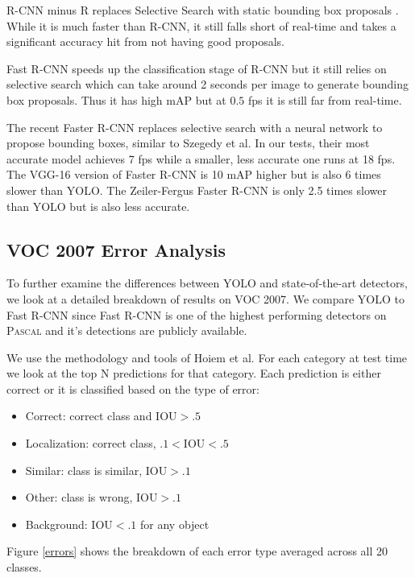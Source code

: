 R-CNN minus R replaces Selective Search with static bounding box proposals \cite{lenc2015r}. While it is much faster than R-CNN, it still falls short of real-time and takes a significant accuracy hit from not having good proposals. 

Fast R-CNN speeds up the classification stage of R-CNN but it still relies on selective search which can take around 2 seconds per image to generate bounding box proposals. Thus it has high mAP but at $0.5$ fps it is still far from real-time.

The recent Faster R-CNN replaces selective search with a neural network to propose bounding boxes, similar to Szegedy et al. \cite{erhan2014scalable} In our tests, their most accurate model achieves 7 fps while a smaller, less accurate one runs at 18 fps. The VGG-16 version of Faster R-CNN is 10 mAP higher but is also 6 times slower than YOLO. The Zeiler-Fergus Faster R-CNN is only 2.5 times slower than YOLO but is also less accurate.

\subsection{VOC 2007 Error Analysis}
\label{error}

To further examine the differences between YOLO and state-of-the-art detectors, we look at a detailed breakdown of results on VOC 2007. We compare YOLO to Fast R-CNN since Fast R-CNN is one of the highest performing detectors on \textsc{Pascal} and it's detections are publicly available.

We use the methodology and tools of Hoiem et al. \cite{hoiem2012diagnosing} For each category at test time we look at the top N predictions for that category. Each prediction is either correct or it is classified based on the type of error:

\begin{itemize}
\itemsep0em
\item Correct: correct class and $\textrm{IOU} > .5$
\item Localization: correct class, $.1 < \textrm{IOU} < .5$
\item Similar: class is similar, $\textrm{IOU} > .1$
\item Other: class is wrong, $\textrm{IOU} > .1$
\item Background: $\textrm{IOU} < .1$ for any object
\end{itemize}

Figure \ref{errors} shows the breakdown of each error type averaged across all 20 classes.

